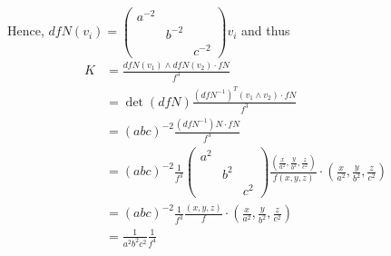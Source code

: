 \documentclass[12pt]{article}
\begin{document}
Hence, $dfN(v_i) = \begin{pmatrix} a^{-2}&&\\&b^{-2}&\\&&c^{-2}\end{pmatrix}v_i$ and thus \begin{align*}
    K &= \frac{dfN(v_1) \wedge dfN(v_2) \cdot fN }{f^3}\\
    &= \det(dfN)\frac{(dfN^{-1})^T(v_1\wedge v_2) \cdot fN}{f^3}\\
    &=(abc)^{-2}\frac{(dfN^{-1})N \cdot fN}{f^3}\\
    &=(abc)^{-2}\frac{1}{f^3}\begin{pmatrix} a^{2}&&\\&b^{2}&\\&&c^{2}\end{pmatrix}\frac{(\frac{x}{a^2},\frac{y}{b^2},\frac{z}{c^2})}{f(x,y,z)} \cdot (\frac{x}{a^2},\frac{y}{b^2},\frac{z}{c^2})\\
    & = (abc)^{-2}\frac{1}{f^3}\frac{(x,y,z)}{f} \cdot (\frac{x}{a^2},\frac{y}{b^2},\frac{z}{c^2})\\
    &= \frac{1}{a^2b^2c^2}\frac{1}{f^4}
\end{align*}
\end{document}
